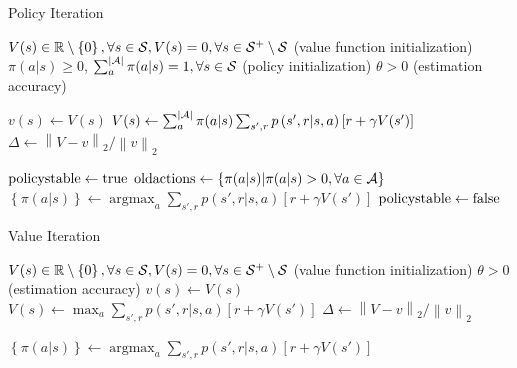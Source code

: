 \documentclass[a4paper]{article}
\DeclareMathOperator*{\argmax}{argmax}
\begin{document}
\begin{algorithm}
\caption{Policy Iteration}\label{alg:policy_iteration}
\begin{algorithmic}[1]
\Require $V(s) \in \mathbb{R} \setminus \left\{0\right\}, \forall s \in {\cal S}, V(s) = 0, \forall s \in {\cal S}^{+} \setminus \cal{S}$ (value function initialization)
\Require $\pi(a|s) \geq 0$, $\sum\nolimits_{a}^{|{\cal A}|}\pi(a|s) = 1, \forall s \in {\cal S}$ (policy initialization)
\Require $\theta > 0$ (estimation accuracy)

\Repeat
{}
\Repeat
{} \label{alg:truncated_policy_iteration_begin}
\State $v(s) \gets V(s)$
\State $V(s) \gets \sum\nolimits_{a}^{|{\cal A}|} {\pi(a|s)} \sum\nolimits_{s',r} { p\left( {s',r|s,a} \right) \left[ r + \gamma V(s') \right] } $ \label{alg:policy_iteration_inplace}
\EndFor \label{alg:truncated_policy_iteration_end}
\State $\Delta \gets \left\| {V - v} \right\|_{2} / \left\| {v} \right\|_{2} $
\Until{$\Delta < \theta$}
\EndProcedure

\State ${\rm policystable} \gets {\rm true}$
\State ${\rm oldactions} \gets \left\{\pi(a|s) | \pi(a|s) > 0 , \forall a \in {\cal A} \right\}$
\State $\left\{\pi(a|s)\right\} \gets \argmax_{a} \sum\nolimits_{s',r} { p\left( {s',r|s,a} \right) \left[ r + \gamma V(s') \right] } $
\State ${\rm policystable} \gets {\rm false}$
\EndIf
\EndFor
\EndProcedure


\EndProcedure
\end{algorithmic}
\end{algorithm}


\begin{algorithm}
\caption{Value Iteration}\label{alg:value_iteration}
\begin{algorithmic}[1]
\Require $V(s) \in \mathbb{R} \setminus \left\{0\right\}, \forall s \in {\cal S}, V(s) = 0, \forall s \in {\cal S}^{+} \setminus \cal{S}$ (value function initialization)
\Require $\theta > 0$ (estimation accuracy)
\Repeat
{} \label{alg:truncated_policy_iteration_begin}
\State $v(s) \gets V(s)$
\State $V(s) \gets \max_{a} \sum\nolimits_{s',r} { p\left( {s',r|s,a} \right) \left[ r + \gamma V(s') \right] } $ \label{alg:value_iteration_inplace}
\EndFor \label{alg:truncated_policy_iteration_end}
\State $\Delta \gets \left\| {V - v} \right\|_{2} / \left\| {v} \right\|_{2} $
\Until{$\Delta < \theta$}

\State $\left\{\pi(a|s)\right\} \gets \argmax_{a} \sum\nolimits_{s',r} { p\left( {s',r|s,a} \right) \left[ r + \gamma V(s') \right] } $
\EndFor

\EndProcedure
\end{algorithmic}
\end{algorithm}
\end{document}
